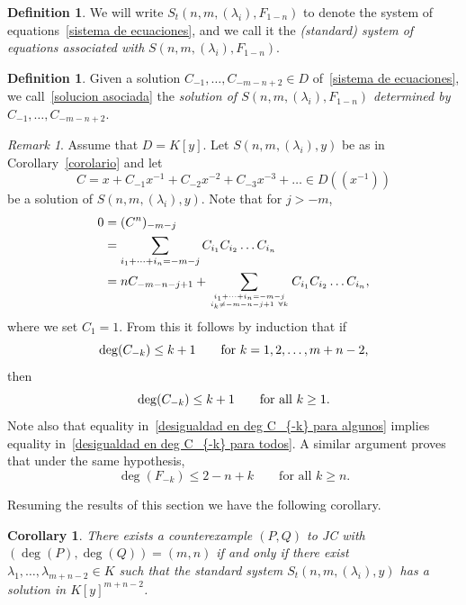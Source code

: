 \documentclass[reqno,a4paper]{amsart}
\newtheorem{corollary}[theorem]{Corollary}
\theoremstyle{definition}
\newtheorem{definition}[theorem]{Definition}
\theoremstyle{remark}
\newtheorem{remark}[theorem]{Remark}
\begin{document}
\begin{definition}\label{sistema de ecuaciones asociado con} We will write
$S_t(n,m,(\lambda_i),F_{1-n})$ to denote the system of equations~\eqref{sistema de ecuaciones},
and we call it the {\em (standard) system of equations associated with} $S(n,m,(\lambda_i),F_{1-n})$.
\end{definition}

\begin{definition}\label{serie determinada por} Given a solution $C_{-1},\dots,C_{-m-n+2}\in D$
of~\eqref{sistema de ecuaciones}, we call~\eqref{solucion asociada} the
{\em solution of $S(n,m,(\lambda_i),F_{1-n})$ determined by $C_{-1},\dots,C_{-m-n+2}$}.
\end{definition}

\begin{remark}\label{acotacion de grado} Assume that $D = K[y]$. Let $S(n,m,(\lambda_i),y)$
be as in Corollary~\ref{corolario} and let
$$
C = x+C_{-1}x^{-1}+C_{-2}x^{-2}+C_{-3}x^{-3}+\dots \in D((x^{-1}))
$$
be a solution of $S(n,m,(\lambda_i),y)$. Note that for $j>-m$,
\begin{align*}
0 &=(C^n)_{-m-j}\\
%
&=\sum_{i_1+\dots +i_n=-m-j}C_{i_1}C_{i_2}\dots C_{i_n}\\
%
&= nC_{-m-n-j+1}+ \sum_{{i_1+\dots +i_n=-m-j}\atop{i_k\ne -m-n-j+1\ \forall k}}C_{i_1}C_{i_2}\dots C_{i_n},
\end{align*}
where we set $C_1 = 1$. From this it follows by induction that if
\begin{equation}\label{desigualdad en deg C_{-k} para algunos}
\deg(C_{-k})\le k+1\qquad\text{for $k=1,2,\dots,m+n-2$,}
\end{equation}
then
\begin{equation}\label{desigualdad en deg C_{-k} para todos}
\deg(C_{-k})\le k+1 \qquad\text{for all $k\ge 1$.}
\end{equation}
Note also that equality in~\eqref{desigualdad en deg C_{-k} para algunos} implies
equality in~\eqref{desigualdad en deg C_{-k} para todos}.  A similar argument proves that
under the same hypothesis,
$$
\deg(F_{-k})\le 2-n+k \qquad\text{for all $k\ge n$.}
$$
\end{remark}

Resuming the results of this section we have the following corollary.

\begin{corollary}\label{caracterizacion} There exists a counterexample $(P,Q)$ to JC with
$(\deg(P),\deg(Q))=(m,n)$ if and only if there exist $\lambda_1,\dots, \lambda_{m+n-2}\in K$
such that the standard system  $S_t(n,m,(\lambda_i),y)$ has a solution in $K[y]^{m+n-2}$.
\end{corollary}
\end{document}
